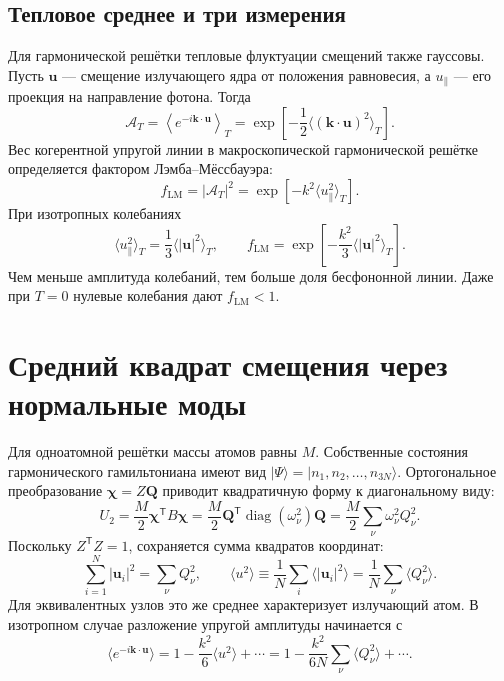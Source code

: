 \documentclass[../final.tex]{subfiles}
\begin{document}
\subsection{Тепловое среднее и три измерения}
Для гармонической решётки тепловые флуктуации смещений также гауссовы.
Пусть $\mathbf u$ --- смещение излучающего ядра от положения равновесия,
а $u_\parallel$ --- его проекция на направление фотона. Тогда
\begin{equation*}
 \mathcal A_T=\left\langle e^{-i\mathbf k\cdot\mathbf u}\right\rangle_T
 =\exp\!\left[-\frac12\langle(\mathbf k\cdot\mathbf u)^2\rangle_T\right].
\end{equation*}
Вес когерентной упругой линии в макроскопической гармонической решётке
определяется фактором Лэмба--Мёссбауэра:
\begin{equation*}
 f_{\mathrm{LM}}=|\mathcal A_T|^2
 =\exp[-k^2\langle u_\parallel^2\rangle_T].
\end{equation*}
При изотропных колебаниях
\begin{equation*}
 \langle u_\parallel^2\rangle_T=\frac13\langle|\mathbf u|^2\rangle_T,
 \qquad
 \boxed{f_{\mathrm{LM}}=\exp\!\left[-\frac{k^2}{3}
 \langle|\mathbf u|^2\rangle_T\right].}
\end{equation*}
Чем меньше амплитуда колебаний, тем больше доля бесфононной линии.
Даже при $T=0$ нулевые колебания дают $f_{\mathrm{LM}}<1$.

\clearpage
\section{Средний квадрат смещения через нормальные моды}
Для одноатомной решётки массы атомов равны $M$.
Собственные состояния гармонического гамильтониана имеют вид
$|\Psi\rangle=|n_1,n_2,\ldots,n_{3N}\rangle$.
Ортогональное преобразование $\boldsymbol\chi=Z\mathbf Q$
приводит квадратичную форму к диагональному виду:
\begin{equation*}
 U_2=\frac M2\boldsymbol\chi^{\mathsf T}B\boldsymbol\chi
 =\frac M2\mathbf Q^{\mathsf T}\operatorname{diag}(\omega_\nu^2)\mathbf Q
 =\frac M2\sum_\nu\omega_\nu^2Q_\nu^2.
\end{equation*}
Поскольку $Z^{\mathsf T}Z=1$, сохраняется сумма квадратов координат:
\begin{equation*}
 \sum_{i=1}^N|\mathbf u_i|^2=\sum_\nu Q_\nu^2,
 \qquad
 \langle u^2\rangle\equiv\frac1N\sum_i\langle|\mathbf u_i|^2\rangle
 =\frac1N\sum_\nu\langle Q_\nu^2\rangle.
\end{equation*}
Для эквивалентных узлов это же среднее характеризует излучающий атом.
В изотропном случае разложение упругой амплитуды начинается с
\begin{equation*}
 \langle e^{-i\mathbf k\cdot\mathbf u}\rangle
 =1-\frac{k^2}{6}\langle u^2\rangle+\cdots
 =1-\frac{k^2}{6N}\sum_\nu\langle Q_\nu^2\rangle+\cdots.
\end{equation*}
\end{document}

